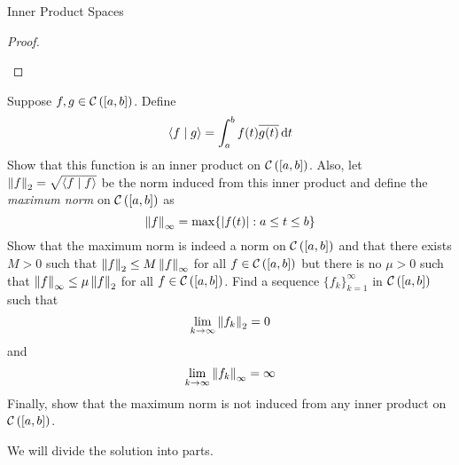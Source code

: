\begin{section}{Inner Product Spaces}
\begin{proof}
\begin{enumerate}[i)]
	\end{enumerate}
\end{proof}		
			

\begin{ex}
	Suppose $f,g \in \mathcal{C} \left( \left[ {a},{b} \right] \right)$. Define
		\begin{displaymath}
			\left \langle {f} \; \vert \; {g} \right \rangle = \int_{a}^{b}{f(t)\overline{g(t)}}\, \mathrm{d}{t}
		\end{displaymath}
	Show that this function is an inner product on $\mathcal{C} \left( \left[ {a},{b} \right] \right)$.
	Also, let $\left \Vert {f} \right \Vert_{2} = \sqrt{\left \langle {f} \; \vert \; {f} \right \rangle}$ be the
	norm induced from this inner product and define the \emph{maximum
	norm} on $\mathcal{C} \left( \left[ {a},{b} \right] \right)$ as
		\begin{displaymath}
			\left \Vert {f} \right \Vert_\infty = \max\{\left \vert {f(t)} \right \vert:a \leq t \leq b\}
		\end{displaymath}
	Show that the maximum norm is indeed a norm on $\mathcal{C} \left( \left[ {a},{b} \right] \right)$
	and that there exists $M > 0$ such that $\left \Vert {f} \right \Vert_{2} \leq M
	\left \Vert {f} \right \Vert_\infty$ for all $f \in \mathcal{C} \left( \left[ {a},{b} \right] \right)$ but there is no
	$\mu > 0$ such that $\left \Vert {f} \right \Vert_\infty \leq \mu \left \Vert {f} \right \Vert_{2}$ for all
	$f \in \mathcal{C} \left( \left[ {a},{b} \right] \right)$. Find a sequence $\{f_k\}_{k=1}^\infty$
	in $\mathcal{C} \left( \left[ {a},{b} \right] \right)$ such that
		\begin{displaymath}
			\lim_{k \rightarrow \infty} \left \Vert {f_k} \right \Vert_{2} = 0
		\end{displaymath}
	and
		\begin{displaymath}
			\lim_{k \rightarrow \infty} \left \Vert {f_k} \right \Vert_\infty = \infty
		\end{displaymath}
	Finally, show that the maximum norm is not induced from any
	inner product on $\mathcal{C} \left( \left[ {a},{b} \right] \right)$.
\end{ex}

\begin{soln}
	We will divide the solution into parts.
		\begin{enumerate}[i)]
		

\end{enumerate}
\end{soln}
\end{section}
